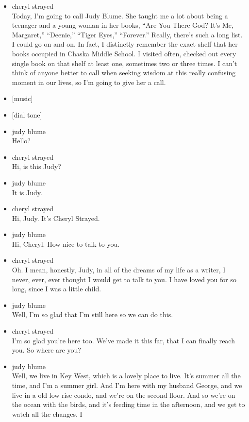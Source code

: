 \begin{itemize}
\item
  cheryl strayed\\
  Today, I'm going to call Judy Blume. She taught me a lot about being a
  teenager and a young woman in her books, ``Are You There God? It's Me,
  Margaret,'' ``Deenie,'' ``Tiger Eyes,'' ``Forever.'' Really, there's
  such a long list. I could go on and on. In fact, I distinctly remember
  the exact shelf that her books occupied in Chaska Middle School. I
  visited often, checked out every single book on that shelf at least
  one, sometimes two or three times. I can't think of anyone better to
  call when seeking wisdom at this really confusing moment in our lives,
  so I'm going to give her a call.
\item
  {[}music{]}
\item
  {[}dial tone{]}
\item
  judy blume\\
  Hello?
\item
  cheryl strayed\\
  Hi, is this Judy?
\item
  judy blume\\
  It is Judy.
\item
  cheryl strayed\\
  Hi, Judy. It's Cheryl Strayed.
\item
  judy blume\\
  Hi, Cheryl. How nice to talk to you.
\item
  cheryl strayed\\
  Oh. I mean, honestly, Judy, in all of the dreams of my life as a
  writer, I never, ever, ever thought I would get to talk to you. I have
  loved you for so long, since I was a little child.
\item
  judy blume\\
  Well, I'm so glad that I'm still here so we can do this.
\item
  cheryl strayed\\
  I'm so glad you're here too. We've made it this far, that I can
  finally reach you. So where are you?
\item
  judy blume\\
  Well, we live in Key West, which is a lovely place to live. It's
  summer all the time, and I'm a summer girl. And I'm here with my
  husband George, and we live in a old low-rise condo, and we're on the
  second floor. And so we're on the ocean with the birds, and it's
  feeding time in the afternoon, and we get to watch all the changes. I

\end{itemize}
